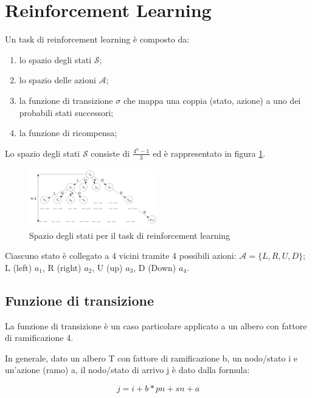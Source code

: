 \documentclass[conference]{IEEEtran}
\begin{document}
\section{Reinforcement Learning}

Un task di reinforcement learning è composto da:

\begin{enumerate}
 \item lo spazio degli stati $\mathcal{S}$;
 \item lo spazio delle azioni $\mathcal{A}$;
 \item la funzione di transizione $\sigma$ che mappa una coppia (stato, azione) a uno dei probabili stati successori;
 \item la funzione di ricompensa;
\end{enumerate}

Lo spazio degli stati $\mathcal{S}$ consiste di $\frac{4^n - 1}{3}$ ed è rappresentato in figura \ref{fig:stateSpace}.

\begin{figure}[h]
\centering
\includegraphics[width=0.5\textwidth]{figure/stateSpace.png}
\caption{Spazio degli stati per il task di reinforcement learning}
\label{fig:stateSpace}
\end{figure}

Ciascuno stato è collegato a 4 vicini tramite 4 possibili azioni: $\mathcal{A} = \{ L, R, U, D\}$; L (left) $a_1$, R (right) $a_2$, U (up) $a_3$, D (Down) $a_4$.

\subsection{Funzione di transizione}

La funzione di transizione è un caso particolare applicato a un albero con fattore di ramificazione 4.

In generale, dato un albero T con fattore di ramificazione b, un nodo/stato i e un'azione (ramo) a, il nodo/stato di arrivo j è dato dalla formula:

\begin{equation}
j = i + b*pn + sn + a
\end{equation}
\end{document}
